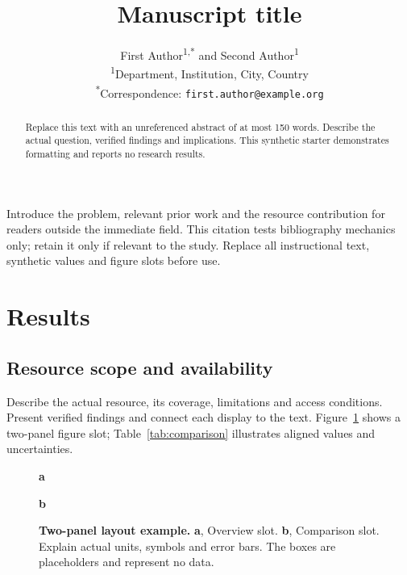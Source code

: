 \documentclass[11pt]{article}
\title{Manuscript title}
\author{First Author\textsuperscript{1,*} and Second Author\textsuperscript{1}\\
  \small \textsuperscript{1}Department, Institution, City, Country\\
  \small \textsuperscript{*}Correspondence: \texttt{first.author@example.org}}
\date{}
\begin{document}
\maketitle
\begin{abstract}
Replace this text with an unreferenced abstract of at most 150 words.
Describe the actual question, verified findings and implications. This
synthetic starter demonstrates formatting and reports no research results.
\end{abstract}

Introduce the problem, relevant prior work and the resource contribution
for readers outside the immediate field. This citation tests bibliography
mechanics only; retain it only if relevant to the study\cite{wilkinson2016fair}.
Replace all instructional text, synthetic values and figure slots before use.

\section{Results}\label{sec:results}
\subsection{Resource scope and availability}
Describe the actual resource, its coverage, limitations and access conditions.
Present verified findings and connect each display to the text.
Figure~\ref{fig:comparison} shows a two-panel figure slot; Table~\ref{tab:comparison}
illustrates aligned values and uncertainties.
\begin{figure}[htbp]
\centering
\begin{minipage}[t]{0.47\linewidth}
\centering\textbf{a}\par\smallskip
{}
\end{minipage}\hfill
\begin{minipage}[t]{0.47\linewidth}
\centering\textbf{b}\par\smallskip
{}
\end{minipage}
\caption{\textbf{Two-panel layout example.} \textbf{a}, Overview slot.
\textbf{b}, Comparison slot. Explain actual units, symbols and error bars.
The boxes are placeholders and represent no data.}
\label{fig:comparison}
\end{figure}
\end{document}
